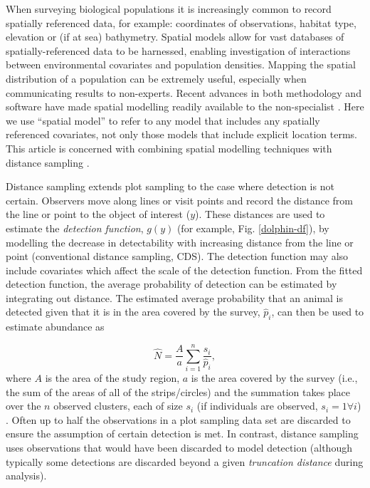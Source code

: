 \documentclass[a4paper,12pt]{article}
\begin{document}
When surveying biological populations it is increasingly common to record spatially referenced data, for example: coordinates of observations, habitat type, elevation or (if at sea) bathymetry. Spatial models allow for vast databases of spatially-referenced data \citep[e.g. OBIS-SEAMAP,][]{Halpin:2009je} to be harnessed, enabling investigation of interactions between environmental covariates and population densities. Mapping the spatial distribution of a population can be extremely useful, especially when communicating results to non-experts. Recent advances in both methodology and software have made spatial modelling readily available to the non-specialist \citep[e.g.,][]{Wood:2006wz, Rue:2009tw}. Here we use ``spatial model'' to refer to any model that includes any spatially referenced covariates, not only those models that include explicit location terms. This article is concerned with combining spatial modelling techniques with distance sampling \citep{Buckland:2001vm, Buckland:2004ts}. 

Distance sampling extends plot sampling to the case where detection is not certain. Observers move along lines or visit points and record the distance from the line or point to the object of interest ($y$). These distances are used to estimate the \textit{detection function}, $g(y)$ (for example, Fig. \ref{dolphin-df}), by modelling the decrease in detectability with increasing distance from the line or point (conventional distance sampling, CDS). The detection function may also include covariates \citep[multiple covariate distance sampling, MCDS;][]{Marques:2007vm} which affect the scale of the detection function. From the fitted detection function, the average probability of detection can be estimated by integrating out distance. The estimated average probability that an animal is detected given that it is in the area covered by the survey, $\hat{p}_i$, can then be used to estimate abundance as

\begin{equation}
\hat{N} = \frac{A}{a} \sum_{i=1}^{n} \frac{s_i}{\hat{p}_i},
\label{ht-est}
\end{equation}
where $A$ is the area of the study region, $a$ is the area covered by the survey (i.e., the sum of the areas of all of the strips/circles) and the summation takes place over the $n$ observed clusters, each of size $s_i$ (if individuals are observed, $s_i=1 \forall i$) \citep[Chapter 3]{Buckland:2001vm}. Often up to half the observations in a plot sampling data set are discarded to ensure the assumption of certain detection is met. In contrast, distance sampling uses observations that would have been discarded to model detection (although typically some detections are discarded beyond a given \textit{truncation distance} during analysis).
\end{document}
